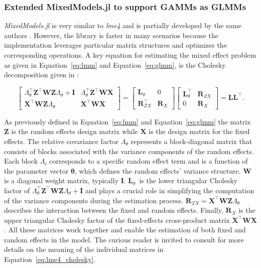 \subsubsection{Extended MixedModels.jl to support GAMMs as GLMMs}\label{sec:julia_modifications}
\textit{MixedModels.jl} is very similar to \textit{lme4} and is partially developed by the same authors \citep{bates_fitting_2015, MixedModelsJl}. However, the library is faster in many scenarios because the implementation leverages particular matrix structures and optimizes the corresponding operations. A key equation for estimating the mixed effect problem as given in Equation~\ref{eq:lmm} and Equation~\ref{eq:glmm}, is the Cholesky decomposition given in \citet[page 14, equation 18]{bates_fitting_2015}:

\begin{equation}\label{eq:lme4_cholesky}
\left[ \begin{array}{cc}
\Lambda_{\theta}^\top \mathbf{Z}^\top \mathbf{W} \mathbf{Z} \Lambda_{\theta} + \mathbf{I} & \Lambda_{\theta}^\top \mathbf{Z}^\top \mathbf{W} \mathbf{X} \\
\mathbf{X}^\top \mathbf{W} \mathbf{Z} \Lambda_{\theta} & \mathbf{X}^\top \mathbf{W} \mathbf{X}
\end{array} \right]
=
\left[ \begin{array}{cc}
\mathbf{L}_{\theta} & 0 \\
\mathbf{R}_{ZX}^\top & \mathbf{R}_{X}
\end{array} \right]
\left[ \begin{array}{cc}
\mathbf{L}_{\theta}^\top & \mathbf{R}_{ZX} \\
0 & \mathbf{R}_{X}
\end{array} \right]
= \mathbf{L}\mathbf{L}^{\top}.
\end{equation}

As previously defined in Equation~\ref{eq:lmm} and Equation~\ref{eq:glmm} the matrix $\mathbf{Z}$ is the random effects design matrix while $\mathbf{X}$ is the design matrix for the fixed effects. The relative covariance factor $\Lambda_{\theta}$ represents a block-diagonal matrix that consists of blocks associated with the variance components of the random effects. Each block $\Lambda_i$ corresponds to a specific random effect term and is a function of the parameter vector $\bm{\theta}$, which defines the random effects' variance structure. $\mathbf{W}$ is a diagonal weight matrix, typically $\mathbf{I}$. $\mathbf{L}_{\theta}$~is the lower triangular Cholesky factor of $\Lambda_{\theta}^\top \mathbf{Z}^\top \mathbf{W} \mathbf{Z} \Lambda_{\theta} + \mathbf{I}$ and plays a crucial role in simplifying the computation of the variance components during the estimation process. $\mathbf{R}_{ZX} = \mathbf{X}^\top \mathbf{W} \mathbf{Z} \Lambda_{\theta}$ describes the interaction between the fixed and random effects. Finally, $\mathbf{R}_{X}$ is the upper triangular Cholesky factor of the fixed-effects cross-product matrix $\mathbf{X}^\top \mathbf{W} \mathbf{X}$. All these matrices work together and enable the estimation of both fixed and random effects in the model. The curious reader is invited to consult \cite{bates_fitting_2015} for more details on the meaning of the individual matrices in Equation~\ref{eq:lme4_cholesky}.


